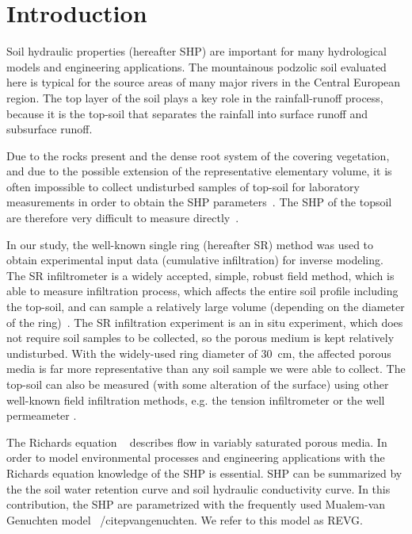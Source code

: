 \documentclass[review]{elsarticle}
\begin{document}
\linenumbers

\section{Introduction}%

Soil hydraulic properties (hereafter SHP) are important for many hydrological models and engineering applications. The mountainous podzolic soil evaluated here is typical for the source areas of many major rivers in the Central European region. The top layer of the soil plays a key role in the rainfall-runoff process, because it is the top-soil that separates the rainfall into surface runoff and subsurface runoff. 


Due to the rocks present and the dense root system of the covering vegetation, and due to the possible extension of the representative elementary volume, it is often impossible to collect undisturbed samples of top-soil for laboratory measurements in order to obtain the SHP parameters~\citep{Jacka1}. The SHP of the topsoil are therefore very difficult to measure directly~\citep{Fodor, Jacka1}. 


In our study, the well-known single ring (hereafter SR) method was used to obtain experimental input data (cumulative infiltration) for inverse modeling. The SR infiltrometer is a widely accepted, simple, robust field method, which is able to measure infiltration process, which affects the entire soil profile including the top-soil,  and can sample a relatively large volume (depending on the diameter of the ring)~\citep{Cheng,ReynoldsWD}.  The SR infiltration experiment is an in situ experiment, which does not require soil samples to be collected, so the porous medium is kept relatively undisturbed. With the widely-used ring diameter of 30~cm, the affected porous media is far more representative than any soil sample  we were able to collect. The top-soil can also be measured (with some alteration of the surface) using other well-known field infiltration methods, e.g. the tension infiltrometer or the well permeameter  \citep{AnguloJaramillo,ReynoldsWDGP}. 

The Richards equation ~\citep{richards} describes flow in variably saturated porous media. In order to model environmental processes and engineering applications with the Richards equation knowledge of the SHP is essential. SHP can be summarized by the the soil water retention curve and soil hydraulic conductivity curve. In this contribution, the SHP are parametrized with the frequently used Mualem-van Genuchten model ~/citep{vangenuchten}. We refer to this model as REVG.
\end{document}
